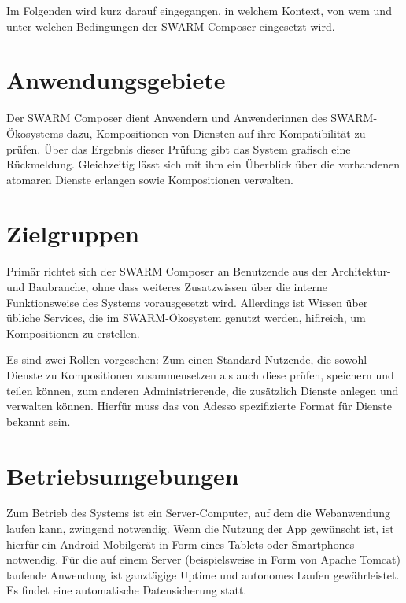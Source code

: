 Im Folgenden wird kurz darauf eingegangen, in welchem Kontext, von wem und unter welchen Bedingungen der SWARM Composer eingesetzt wird.

\section*{Anwendungsgebiete}
Der SWARM Composer dient Anwendern und Anwenderinnen des SWARM-Ökosystems dazu, Kompositionen von Diensten auf ihre Kompatibilität zu prüfen. Über das Ergebnis dieser Prüfung gibt das System grafisch eine Rückmeldung. Gleichzeitig lässt sich mit ihm ein Überblick über die vorhandenen atomaren Dienste erlangen sowie Kompositionen verwalten. 

\section*{Zielgruppen}

Primär richtet sich der SWARM Composer an Benutzende aus der Architektur- und Baubranche, ohne dass weiteres Zusatzwissen über die interne Funktionsweise des Systems vorausgesetzt wird. Allerdings ist Wissen über übliche Services, die im SWARM-Ökosystem genutzt werden, hiflreich, um Kompositionen zu erstellen.

Es sind zwei Rollen vorgesehen: Zum einen Standard-Nutzende, die sowohl Dienste zu Kompositionen zusammensetzen als auch diese prüfen, speichern und teilen können, zum anderen Administrierende, die zusätzlich Dienste anlegen und verwalten können. Hierfür muss das von Adesso spezifizierte Format für Dienste bekannt sein.

\section*{Betriebsumgebungen}

Zum Betrieb des Systems ist ein Server-Computer, auf dem die Webanwendung laufen kann, zwingend notwendig. Wenn die Nutzung der App gewünscht ist, ist hierfür ein Android-Mobilgerät in Form eines Tablets oder Smartphones notwendig. Für die auf einem Server (beispielsweise in Form von Apache Tomcat) laufende Anwendung ist ganztägige Uptime und autonomes Laufen gewährleistet. Es findet eine automatische Datensicherung statt.




